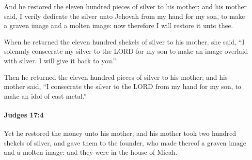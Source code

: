 			\begin{versebox}
					\item[BHS] 
					\item[ASV] And he restored the eleven hundred pieces of silver to his mother; and his mother said, I verily dedicate the silver unto Jehovah from my hand for my son, to make a graven image and a molten image: now therefore I will restore it unto thee.
					\item[NIV] When he returned the eleven hundred shekels of silver to his mother, she said, “I solemnly consecrate my silver to the LORD for my son to make an image overlaid with silver. I will give it back to you.”
					\item[NRSV] Then he returned the eleven hundred pieces of silver to his mother; and his mother said, “I consecrate the silver to the LORD from my hand for my son, to make an idol of cast metal.”
			\end{versebox}

		\paragraph{Judges 17:4} %
			\label{JUDGES-17-4}

			Yet he restored the money unto his mother; and his mother took two hundred shekels of silver, and gave them to the founder, who made thereof a graven image and a molten image: and they were in the house of Micah.

